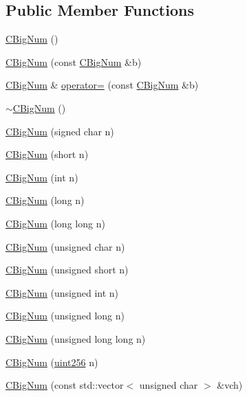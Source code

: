 \subsection*{Public Member Functions}
\begin{DoxyCompactItemize}
\item 
\hyperlink{class_c_big_num_a272ed55454635b770e181bddc1a9c071}{C\+Big\+Num} ()
\item 
\hyperlink{class_c_big_num_a50fcecb7d672c2b7d0a89e641a0682ca}{C\+Big\+Num} (const \hyperlink{class_c_big_num}{C\+Big\+Num} \&b)
\item 
\hyperlink{class_c_big_num}{C\+Big\+Num} \& \hyperlink{class_c_big_num_a575e705d2120b0a43d74d798eaef48ee}{operator=} (const \hyperlink{class_c_big_num}{C\+Big\+Num} \&b)
\item 
\hyperlink{class_c_big_num_a0cf323763ff64c47cac7ababd2f23683}{$\sim$\+C\+Big\+Num} ()
\item 
\hyperlink{class_c_big_num_a318644830d41471cd2bbcd702975bbb1}{C\+Big\+Num} (signed char n)
\item 
\hyperlink{class_c_big_num_a0f4e34dcc48e9089e9f20c06418755c9}{C\+Big\+Num} (short n)
\item 
\hyperlink{class_c_big_num_a930e53591ce24f650f7ddd1076bd4efe}{C\+Big\+Num} (int n)
\item 
\hyperlink{class_c_big_num_a96ef554f3153f676125a49889303cf31}{C\+Big\+Num} (long n)
\item 
\hyperlink{class_c_big_num_a221b65c70969363c1b9d940a6a2de3b5}{C\+Big\+Num} (long long n)
\item 
\hyperlink{class_c_big_num_afe63a4eb433e69687fad44193390dc1b}{C\+Big\+Num} (unsigned char n)
\item 
\hyperlink{class_c_big_num_a3745ad1eb1bd53c9535f8620515d3ae3}{C\+Big\+Num} (unsigned short n)
\item 
\hyperlink{class_c_big_num_a87ff912ff941f4bc4ba10482c502757d}{C\+Big\+Num} (unsigned int n)
\item 
\hyperlink{class_c_big_num_ab10a8c87dd0e8ca79f67df75ca7e7ecc}{C\+Big\+Num} (unsigned long n)
\item 
\hyperlink{class_c_big_num_a18865e153442cd15aec3bfc9acda8dce}{C\+Big\+Num} (unsigned long long n)
\item 
\hyperlink{class_c_big_num_a47684495c159d6279490151ae4497332}{C\+Big\+Num} (\hyperlink{classuint256}{uint256} n)
\item 
\hyperlink{class_c_big_num_ad3c2843e6755a612b8734eb6e0f03ced}{C\+Big\+Num} (const std\+::vector$<$ unsigned char $>$ \&vch)

\end{DoxyCompactItemize}
